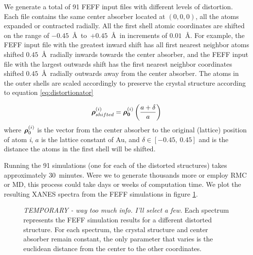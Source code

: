 We generate a total of 91 FEFF input files with different levels of distortion. Each file contains the same center absorber located at $ (0,0,0) $, all the atoms expanded or contracted radially. All the first shell atomic coordinates are shifted on the range of $ -0.45 $~\AA~to~$ +0.45 $~\AA~in increments of $ 0.01 $~\AA. For example, the FEFF input file with the greatest inward shift has all first nearest neighbor atoms shifted $ 0.45 $~\AA~radially inwards towards the center absorber, and the FEFF input file with the largest outwards shift has the first nearest neighbor coordinates shifted $ 0.45 $~\AA~radially outwards away from the center absorber. The atoms in the outer shells are scaled accordingly to preserve the crystal structure according to equation \ref{eq:distortionator}

\begin{equation}
	\label{eq:distortionator}
	\vb*{\rho}_{shifted}^{(i)} = \vb*{\rho_0}^{(i)} \left( \dfrac{a + \delta}{a} \right)
\end{equation}
where $ \vb*{\rho}_0^{(i)} $ is the vector from the center absorber to the original (lattice) position of atom \textit{i}, $ a $ is the lattice constant of Au, and $ \delta \in [-0.45,~0.45] $ and is the distance the atoms in the first shell will be shifted.   



\noindent Running the 91 simulations (one for each of the distorted structures) takes approximately 30~minutes. Were we to generate thousands more or employ RMC or MD, this process could take days or weeks of computation time. We plot the resulting XANES spectra from the FEFF simulations in figure \ref{fig:feff-results}.

\begin{figure}[h]
	\centering
	\caption[FEFF Simulations Results]{\textit{TEMPORARY - way too much info. I'll select a few. }Each spectrum represents the FEFF simulation results for a different distorted structure. For each spectrum, the crystal structure and center absorber remain constant, the only parameter that varies is the euclidean distance from the center to the other coordinates.}
	\label{fig:feff-results}
\end{figure}

